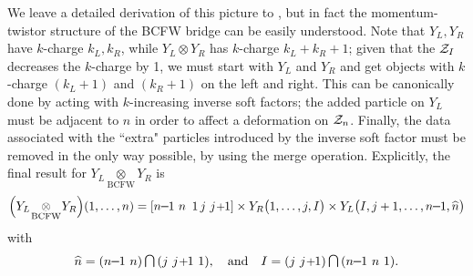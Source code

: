 \documentclass[11pt, reqno]{article}
\newcommand{\smallminus}{{\rm\rule[2.4pt]{6pt}{0.65pt}}}
\newcommand{\smallplus}{\hspace{0.5pt}\text{{\small+}}\hspace{-0.5pt}}
\renewcommand{\cap}{\mathrm{\raisebox{0.75pt}{{$\,\bigcap\,$}}}}
\begin{document}
We leave a detailed derivation of this picture to \cite{InPrep}, but in fact the momentum-twistor structure of the BCFW bridge can be easily understood. Note that $Y_L,Y_R$ have $k$-charge $k_L,k_R$, while $Y_L \otimes Y_R$ has $k$-charge $k_L + k_R + 1$; given that the ${\cal Z}_I$ decreases the $k$-charge by 1,  we must start with $Y_L$ and $Y_R$ and get objects with $k$-charge $(k_L + 1)$ and $(k_R+1)$ on the left and right. This can be canonically done by acting with $k$-increasing inverse soft factors; the added particle on $Y_L$ must be adjacent to $n$ in order to affect a deformation on ${\cal Z}_n$. Finally, the data associated with the ``extra" particles introduced by the inverse soft factor must be removed in the only way possible, by using the merge operation. Explicitly, the final result for $Y_L \!\underset{\mathrm{BCFW}}{\otimes}\! Y_R$ is
\begin{equation}
 \Big(Y_L\!\underset{\mathrm{BCFW}}{\otimes}\!
Y_R\Big)(1,\ldots,n) = [n\smallminus1\,\,n\,\, \, 1 \, j \,\, j\smallplus1]\times Y_R\big(1,\ldots, j,I\big) \times Y_L\big(I,j+1,\ldots, n\smallminus1,\widehat n\big)
\end{equation}
with\vspace{-0.3cm}
\begin{equation}
 \widehat n = (n\smallminus1\,\,n) \cap (j\,\,j\smallplus1\,\,1), \quad\mathrm{and}\quad I = (j\,\,j\smallplus1) \cap (n\smallminus1\,\,n\,\,1).
\end{equation}
\end{document}
